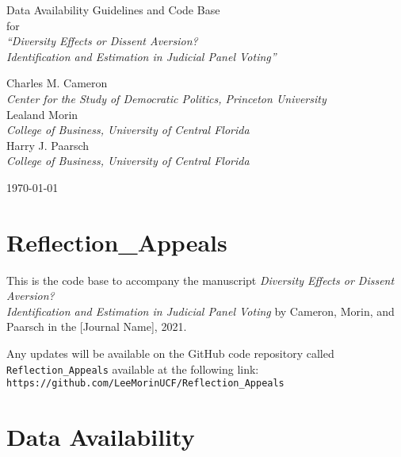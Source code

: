 \documentclass[11pt]{paper}
\begin{document}
\phantom{0}
\vspace{1.0in}


\begin{centering}

{\huge 
Data Availability Guidelines and Code Base  \\
\bigskip
for \\
\bigskip
{\it ``Diversity Effects or Dissent Aversion? \\
Identification and Estimation in Judicial Panel Voting''} \\
}

\vspace{1.25in}


{\large 
Charles M. Cameron \\
{\it Center for the Study of Democratic Politics, Princeton University} \\
\medskip
Lealand Morin \\
{\it College of Business, University of Central Florida} \\
\medskip
Harry J. Paarsch \\
{\it College of Business, University of Central Florida} \\
}

\vspace{1.25in}



\today

\end{centering}


\pagebreak

\section*{Reflection\_Appeals}

This is the code base to accompany the manuscript 
{\it Diversity Effects or Dissent Aversion? \\
Identification and Estimation in Judicial Panel Voting} 
by Cameron, Morin, and Paarsch in the [Journal Name], 2021. 

Any updates will be available on the GitHub code repository 
called  \texttt{Reflection\_Appeals}
available at the following link: \\

\texttt{https://github.com/LeeMorinUCF/Reflection\_Appeals} \\


\section*{Data Availability}
\end{document}
